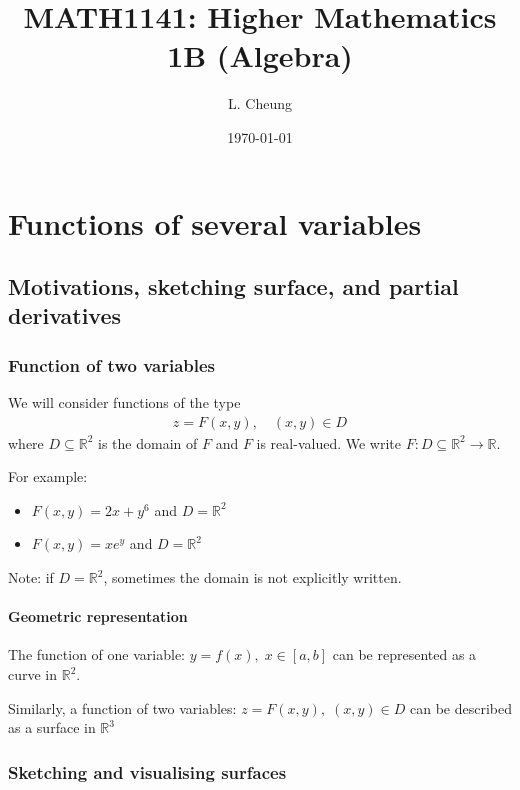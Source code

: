 \documentclass{report}
\title{\textbf{MATH1141: Higher Mathematics 1B (Algebra)}}
\author{L. Cheung}
\date{\today}
\begin{document}
\maketitle
\tableofcontents
\newpage

\chapter{Functions of several variables}

	\section{Motivations, sketching surface, and partial derivatives}

		\subsection{Function of two variables}

			We will consider functions of the type
				\begin{align*}
					z = F(x,y), \quad (x,y) \in D
				\end{align*}
			where $D \subseteq \mathbb{R}^2$ is the domain of $F$ and $F$ is real-valued. We write $F: D \subseteq \mathbb{R}^2 \to \mathbb{R}$.

			For example:
			\begin{itemize}
				\item $F(x,y) = 2x + y^6$ and $D = \mathbb{R}^2$
				\item $F(x,y) = xe^y$ and $D = \mathbb{R}^2$
			\end{itemize}

			\textcolor{pastel_yellow}{Note}: if $D = \mathbb{R}^2$, sometimes the domain is not explicitly written.

			\subsubsection{Geometric representation}

				The function of one variable: $y = f(x), \; x \in [a,b]$ can be represented as a curve in $\mathbb{R}^2$.

				Similarly, a function of two variables: $z = F(x,y), \; (x,y) \in D$ can be described as a surface in $\mathbb{R}^3$

		\subsection{Sketching and visualising surfaces}
\end{document}

